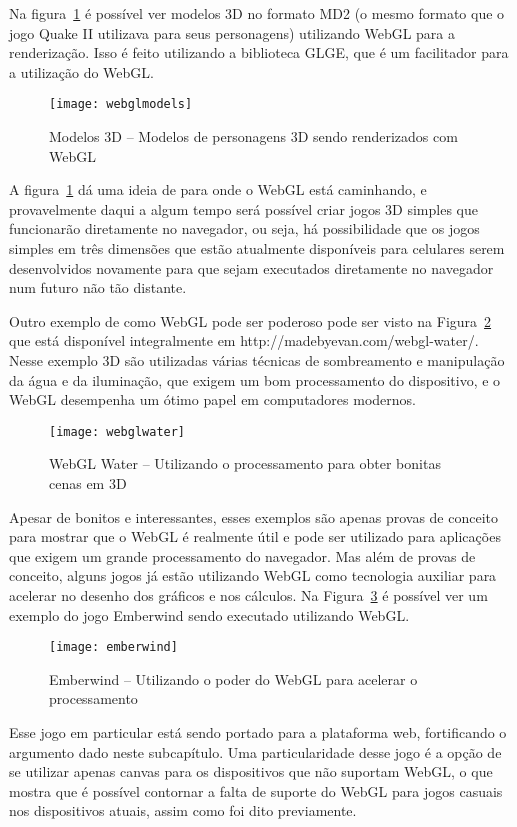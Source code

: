 Na figura~\ref{img:webglmodels} é possível ver modelos 3D no formato
MD2 (o mesmo formato que o jogo Quake II utilizava para seus
personagens) utilizando WebGL para a renderização. Isso é feito utilizando a
biblioteca GLGE, que é um facilitador para a utilização do WebGL.

\begin{figure}[H]
  \centering
	\texttt{[image: webglmodels]}
  \caption{Modelos 3D {--} Modelos de personagens 3D sendo renderizados com WebGL}
  \label{img:webglmodels}
\end{figure}

A figura~\ref{img:webglmodels} dá uma ideia de para onde o WebGL está
caminhando, e provavelmente daqui a algum tempo será possível criar
jogos 3D simples que funcionarão diretamente no navegador, ou seja, há
possibilidade que os jogos simples em três dimensões que estão atualmente
disponíveis para celulares serem desenvolvidos novamente para que
sejam executados diretamente no navegador num futuro não tão distante.

Outro exemplo de como WebGL pode ser poderoso pode ser visto na Figura~\ref{img:webglwater}
que está disponível integralmente em http://madebyevan.com/webgl-water/.
Nesse exemplo 3D são utilizadas várias técnicas de sombreamento e
manipulação da água e da iluminação, que exigem um bom processamento
do dispositivo, e o WebGL desempenha um ótimo papel em computadores
modernos.

\begin{figure}[H]
  \centering
	\texttt{[image: webglwater]}
  \caption{WebGL Water {--} Utilizando o processamento para obter
  bonitas cenas em 3D}
  \label{img:webglwater}
\end{figure}

Apesar de bonitos e interessantes, esses exemplos são apenas provas de
conceito para mostrar que o WebGL é realmente útil e pode ser
utilizado para aplicações que exigem um grande processamento do
navegador. Mas além de provas de conceito, alguns jogos já estão
utilizando WebGL como tecnologia auxiliar para acelerar no desenho dos
gráficos e nos cálculos.
Na Figura~\ref{img:emberwind} é possível ver um exemplo do jogo Emberwind
sendo executado utilizando WebGL.

\begin{figure}[H]
  \centering
	\texttt{[image: emberwind]}
  \caption{Emberwind {--} Utilizando o poder do WebGL para acelerar o processamento}
  \label{img:emberwind}
\end{figure}

Esse jogo em particular está sendo portado para a plataforma web,
fortificando o argumento dado neste subcapítulo. Uma particularidade
desse jogo é a opção de se utilizar apenas canvas para os dispositivos
que não suportam WebGL, o que mostra que é possível contornar a falta
de suporte do WebGL para jogos casuais nos dispositivos atuais, assim
como foi dito previamente.

\clearpage
